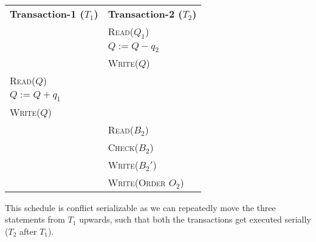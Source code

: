 \begin{center}
    \begin{adjustbox}{width=\textwidth}
        \begin{tabularx}{\textwidth}{|X|X|}
        \hline
        \multirow{2}{*}{\textbf{Transaction-1 ($T_{1}$)}} & \multirow{2}{*}{\textbf{Transaction-2 ($T_{2}$)}} \\
        & \\ \hline
        & \textsc{Read($Q_{1}$)} \\
        & \textsc{$Q := Q - q_{2}$} \\
        & \textsc{Write($Q$)} \\
        \textsc{Read($Q$)} & \\
        \textsc{$Q := Q + q_{1}$} & \\
        \textsc{Write($Q$)} & \\
        & \textsc{Read($B_{2}$)} \\
        & \textsc{Check($B_{2}$)} \\
        & \textsc{Write($B_{2}'$)} \\
        & \textsc{Write(Order $O_{2}$)} \\
        \hline
        \end{tabularx}
    \end{adjustbox}
\end{center}
\vspace*{10pt}
This schedule is conflict serializable as we can repeatedly move the three statements from $T_{1}$ upwards, such that
both the transactions get executed serially ($T_{2}$ after $T_{1}$).